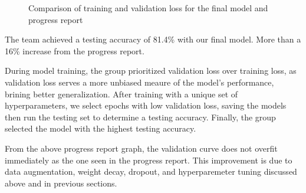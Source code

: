 \documentclass{article} %
\begin{document}
\FloatBarrier
\begin{figure}[h]
    \centering
    \hfill
    \caption{Comparison of training and validation loss for the final model and progress report}
    \label{fig:sideBySideGraphs}
\end{figure}
\FloatBarrier

The team achieved a testing accuracy of 81.4\% with our final model. More than a 16\% increase from the progress report.

During model training, the group prioritized validation loss over training loss, as validation loss serves a more unbiased meaure of the model's performance, brining better generalization. After training with a unique set of hyperparameters, we select epochs with low validation loss, saving the models then run the testing set to determine a testing accuracy. Finally, the group selected the model with the highest testing accuracy.

From the above progress report graph, the validation curve does not overfit immediately as the one seen in the progress report. This improvement is due to data augmentation, weight decay, dropout, and hyperparemeter tuning discussed above and in previous sections. 
\end{document}
